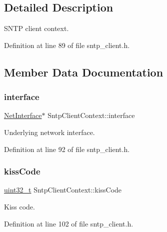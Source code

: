 \subsection{Detailed Description}
S\+N\+TP client context. 

Definition at line 89 of file sntp\+\_\+client.\+h.



\subsection{Member Data Documentation}
\mbox{\label{structSntpClientContext_a201932df4f0b97e8b837d05658fb1a48}} 
\subsubsection{\texorpdfstring{interface}{interface}}
{\footnotesize\ttfamily \hyperlink{net_8h_a2234db8911a1148c9159979d8f5e0d6b}{Net\+Interface}$\ast$ Sntp\+Client\+Context\+::interface}



Underlying network interface. 



Definition at line 92 of file sntp\+\_\+client.\+h.

\mbox{\label{structSntpClientContext_af69b89fcaec3ccf3949de106a1768c77}} 
\subsubsection{\texorpdfstring{kiss\+Code}{kissCode}}
{\footnotesize\ttfamily \hyperlink{stdint_8h_a435d1572bf3f880d55459d9805097f62}{uint32\+\_\+t} Sntp\+Client\+Context\+::kiss\+Code}



Kiss code. 



Definition at line 102 of file sntp\+\_\+client.\+h.

\mbox{\label{structSntpClientContext_a01d165c31bb0453f58841511183b37cc}} 
